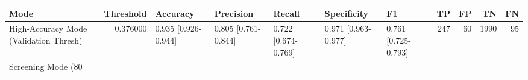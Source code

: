 \begin{tabular}{lrlllllrrrr}
\toprule
Mode & Threshold & Accuracy & Precision & Recall & Specificity & F1 & TP & FP & TN & FN \\
\midrule
High-Accuracy Mode (Validation Thresh) & 0.376000 & 0.935 [0.926-0.944] & 0.805 [0.761-0.844] & 0.722 [0.674-0.769] & 0.971 [0.963-0.977] & 0.761 [0.725-0.793] & 247 & 60 & 1990 & 95 \\
Screening Mode (80%
\bottomrule
\end{tabular}
